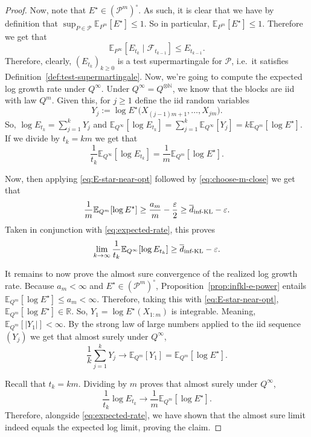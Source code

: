 \documentclass[11pt]{article}
\newcommand{\infKL}{\textnormal{inf-KL}}
\newcommand{\E}{\mathbb{E}}
\newcommand{\Pcal}{\mathcal{P}}
\theoremstyle{definition}
\theoremstyle{definition}
\begin{document}
\begin{proof}
Now, note that $E^\star\in(\Pcal^m)^\circ$. As such, it is clear that we have by definition that $\sup_{P\in\mathcal P}\E_{P^m}[E^\star]\le 1$. So in particular, $\E_{P^m}[E^\star]\le 1$. Therefore we get that
\[
\E_{P^\infty}[E_{t_k}\mid\mathcal F_{t_{k-1}}]\le E_{t_{k-1}}.
\]
Therefore, clearly, $(E_{t_k})_{k\ge 0}$ is a test supermartingale for $\Pcal$, i.e.\ it satisfies Definition~\ref{def:test-supermartingale}. Now, we're going to compute the expected log growth rate under $Q^\infty$. Under $Q^\infty=Q^{\otimes\mathbb N}$, we know that the blocks are iid with law $Q^m$. Given this, for $j\ge 1$ define the iid random variables
\[
Y_j:=\log E^\star\bigl(X_{(j-1)m+1},\dots,X_{jm}\bigr).
\]
So, $\log E_{t_k}=\sum_{j=1}^k Y_j$ and $\E_{Q^\infty}[\log E_{t_k}]=\sum_{j=1}^k \E_{Q^\infty}[Y_j] = k\E_{Q^m}[\log E^\star]$. If we divide by $t_k=km$ we get that
\begin{equation}\label{eq:expected-rate}
\frac{1}{t_k}\E_{Q^\infty}[\log E_{t_k}]=\frac{1}{m}\E_{Q^m}[\log E^\star].   
\end{equation}

Now, then applying \eqref{eq:E-star-near-opt} followed by \eqref{eq:choose-m-close} we get that
\[
\frac{1}{m}\E_{Q^m}[\log E^\star] \ge \frac{a_m}{m}-\frac{\varepsilon}{2} \ge \overline d_{\infKL}-\varepsilon.
\]
Taken in conjunction with \eqref{eq:expected-rate}, this proves
\[
\lim_{k\to\infty}\frac{1}{t_k}\E_{Q^\infty}[\log E_{t_k}]\ge \overline d_{\infKL}-\varepsilon.
\]

It remains to now prove the almost sure convergence of the realized log growth rate. Because $a_m<\infty$ and $E^\star\in(\Pcal^m)^\circ$, Proposition~\ref{prop:infkl-e-power} entails $\E_{Q^m}[\log E^\star]\le a_m<\infty$. Therefore, taking this with \eqref{eq:E-star-near-opt}, $\E_{Q^m}[\log E^\star]\in\mathbb R$. So, $Y_1=\log E^\star(X_{1:m})$ is integrable. Meaning, $\E_{Q^m}[|Y_1|]<\infty$. By the strong law of large numbers applied to the iid sequence $(Y_j)$ we get that almost surely under $Q^\infty$,
\[
\frac{1}{k}\sum_{j=1}^k Y_j\to\E_{Q^m}[Y_1]=\E_{Q^m}[\log E^\star].
\]

Recall that $t_k=km$. Dividing by $m$ proves that almost surely under $Q^\infty$,
\[
\frac{1}{t_k}\log E_{t_k} \to \frac{1}{m}\E_{Q^m}[\log E^\star].
\]
Therefore, alongside \eqref{eq:expected-rate}, we have shown that the almost sure limit indeed equals the expected log limit, proving the claim.
\end{proof}
\end{document}
